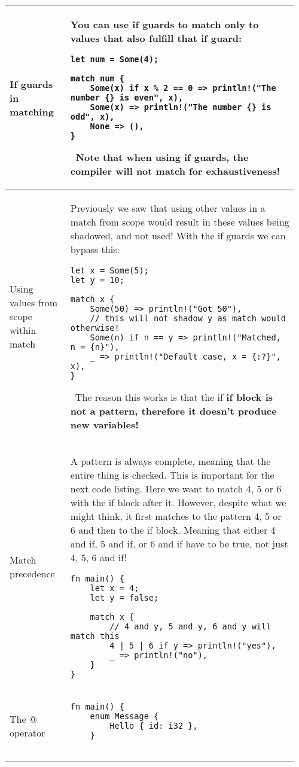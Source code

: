\documentclass[main.tex,fontsize=8pt,paper=a4,paper=portrait,DIV=calc,]{scrartcl}
\begin{document}
\begin{table}[ht!]
\begin{tabular}{|m{0.2\linewidth}|m{0.755\linewidth}|}
\hline
If guards in matching & 
You can use if guards to match only to values that also fulfill that if guard:\newline
\begin{lstlisting}
let num = Some(4);

match num {
    Some(x) if x % 2 == 0 => println!("The number {} is even", x),
    Some(x) => println!("The number {} is odd", x),
    None => (),
}
\end{lstlisting} 
\, \newline
\textcolor{OliveGreen}{Note that when using if guards, the compiler will not match for exhaustiveness!}\\
\hline
Using values from scope within match & 
Previously we saw that using other values in a match from scope would result in these values being shadowed, and not used!\newline
With the if guards we can bypass this:\newline
\begin{lstlisting}
let x = Some(5);
let y = 10;

match x {
    Some(50) => println!("Got 50"),
    // this will not shadow y as match would otherwise!
    Some(n) if n == y => println!("Matched, n = {n}"),
    _ => println!("Default case, x = {:?}", x),
}
\end{lstlisting} 
\, \newline
\textcolor{OliveGreen}{The reason this works is that the if \textbf{if block is not a pattern, therefore it doesn't produce new variables!}}\\
\hline
Match precedence & 
A pattern is always complete, meaning that the entire thing is checked.\newline
This is important for the next code listing. Here we want to match 4, 5 or 6 with the if block after it.\newline
However, despite what we might think, it first matches to the pattern 4, 5 or 6 and then to the if block.\newline
Meaning that either 4 and if, 5 and if, or 6 and if have to be true, not just 4, 5, 6 and if!\newline
\begin{lstlisting}
fn main() {
    let x = 4;
    let y = false;

    match x {
        // 4 and y, 5 and y, 6 and y will match this
        4 | 5 | 6 if y => println!("yes"),
        _ => println!("no"),
    }
}
\end{lstlisting}\\
\hline
The @ operator & 
\begin{lstlisting}
fn main() {
    enum Message {
        Hello { id: i32 },
    }


\end{lstlisting}
\end{tabular}
\end{table}
\end{document}
